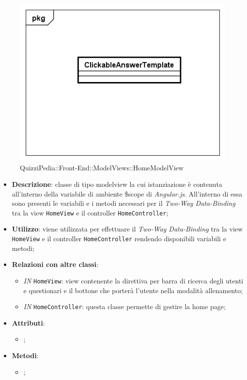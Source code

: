 	\begin{figure}[ht]
		\centering
		\includegraphics[scale=0.5,keepaspectratio]{UML/Classi/Front-End/QuizziPedia_Front-end_Templates_ClickableAnswerTemplate.png}
		\caption{QuizziPedia::Front-End::ModelViews::HomeModelView}
	\end{figure} \FloatBarrier
	
	\begin{itemize}
		\item \textbf{Descrizione}: classe di tipo modelview la cui istanziazione è contenuta all'interno della variabile di ambiente \$scope di \textit{Angular.js}. All'interno di essa sono presenti le variabili e i metodi necessari per il \textit{Two-Way Data-Binding} tra la view \texttt{HomeView} e il controller \texttt{HomeController};
		\item \textbf{Utilizzo}: viene utilizzata per effettuare il \textit{Two-Way Data-Binding} tra la view \texttt{HomeView} e il controller \texttt{HomeController} rendendo disponibili variabili e metodi;
		\item \textbf{Relazioni con altre classi}: 
		\begin{itemize}
			\item \textit{IN} \texttt{HomeView}: view contenente la direttiva per barra di ricerca degli utenti e questionari e il bottone che porterà l’utente nella modalità allenamento; 
			\item \textit{IN} \texttt{HomeController}: questa classe permette di gestire la home page;
		\end{itemize}
		\item \textbf{Attributi}: 
		\begin{itemize}
			\item ;
		\end{itemize}
		\item \textbf{Metodi}: 
		\begin{itemize}
			\item ;
		\end{itemize}
	\end{itemize}
	
